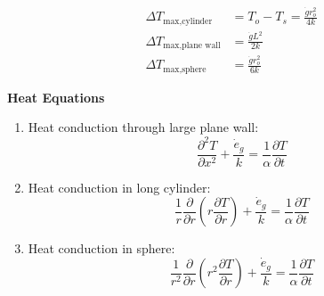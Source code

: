 \begin{align*}
    \Delta T_{\text{max,cylinder}}&= T_o - T_s = \frac{\dot{g}r_o^2}{4k} \\
    \Delta T_{\text{max,plane wall}} &= \frac{\dot{g}L^2}{2k} \\
    \Delta T_{\text{max,sphere}} &= \frac{\dot{g}r_o^2}{6k}
\end{align*}

\large\textbf{Heat Equations}
\begin{enumerate}
    \item Heat conduction through \color{red} large plane wall: \color{black}
    \begin{equation*}
        \frac{\partial^2 T}{\partial x^2} + \frac{\dot{e}_g}{k} = \frac{1}{\alpha} \frac{\partial T}{\partial t}
    \end{equation*}
    \item Heat conduction in \color{red} long cylinder: \color{black}
    \begin{equation*}
        \frac{1}{r} \frac{\partial}{\partial r}\left(r \frac{\partial T}{\partial r}\right) + \frac{\dot{e}_g}{k} = \frac{1}{\alpha} \frac{\partial T}{\partial t}
    \end{equation*}
    \item Heat conduction in \color{red} sphere: \color{black}
    \begin{equation*}
        \frac{1}{r^2} \frac{\partial}{\partial r} \left( r^2 \frac{\partial T}{\partial r}\right) + \frac{\dot{e}_g}{k} = \frac{1}{\alpha} \frac{\partial T}{\partial t}
    \end{equation*}
\end{enumerate}

